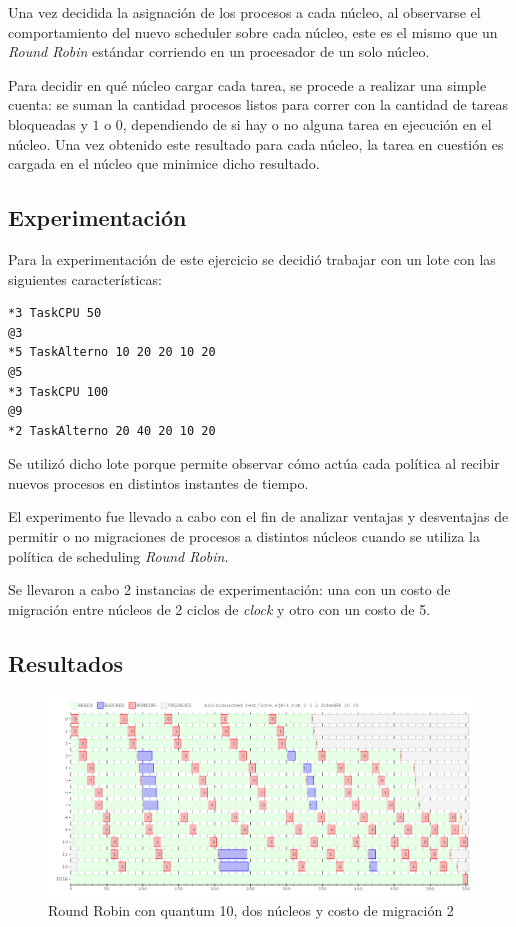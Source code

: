 \documentclass[a4paper]{article}
\begin{document}
Una vez decidida la asignación de los procesos a cada núcleo, al observarse
el comportamiento del nuevo scheduler sobre cada núcleo, este es el mismo
que un \textit{Round Robin} estándar corriendo en un procesador de un solo
núcleo.

Para decidir en qué núcleo cargar cada tarea, se procede a realizar una
simple cuenta: se suman la cantidad procesos listos para correr con la
cantidad de tareas bloqueadas y $1$ o $0$, dependiendo de si hay o no alguna
tarea en ejecución en el núcleo. Una vez obtenido este resultado para cada
núcleo, la tarea en cuestión es cargada en el núcleo que minimice dicho
resultado.

\subsection{Experimentación}
Para la experimentación de este ejercicio se decidió trabajar con un lote
con las siguientes características:

\begin{verbatim}
*3 TaskCPU 50
@3
*5 TaskAlterno 10 20 20 10 20
@5
*3 TaskCPU 100
@9
*2 TaskAlterno 20 40 20 10 20
\end{verbatim}

Se utilizó dicho lote porque permite observar cómo actúa cada política al
recibir nuevos procesos en distintos instantes de tiempo.

El experimento fue llevado a cabo con el fin de analizar ventajas y
desventajas de permitir o no migraciones de procesos a distintos núcleos
cuando se utiliza la política de scheduling \textit{Round Robin}.

Se llevaron a cabo 2 instancias de experimentación: una con un costo de
migración entre núcleos de 2 ciclos de \textit{clock} y otro con un costo de
5.

\subsection{Resultados}

\begin{figure}[H]
\begin{center}
\includegraphics[scale=0.4]{imagenes/ej8-1-rr-c-2.png}
\end{center}
\caption{Round Robin con quantum 10, dos núcleos y costo de migración 2}
\end{figure}
\end{document}
